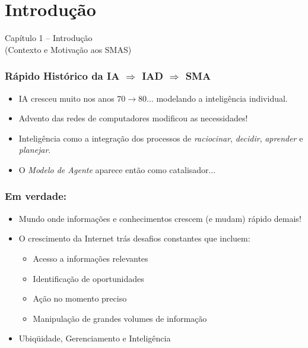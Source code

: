 
\section{Introdução}


\begin{frame}

\begin{center}
{\huge Capítulo 1 -- Introdução}\\
(Contexto e Motivação aos SMAS)
\end{center}

\end{frame}

\begin{frame}

  \frametitle{Rápido Histórico da IA $\Rightarrow$  IAD $\Rightarrow$ SMA}
    
\begin{itemize}
  \item IA cresceu muito nos anos $70 \rightarrow 80 ...$
   modelando a inteligência individual.
  \item  Advento das redes de computadores modificou as necessidades!
  \item  Inteligência como a integração dos processos de \textit{raciocinar},    \textit{decidir}, \textit{aprender} e  \textit{planejar}.
  \item  O \textit{Modelo de Agente} aparece então como catalisador...
\end{itemize}


\end{frame}

\begin{frame} %

 \frametitle{Em verdade:}

\begin{itemize}
  \item Mundo onde informações e conhecimentos crescem (e mudam) rápido demais!
    \item O crescimento da Internet trás desafios constantes que incluem:
    \begin{itemize}
  \item Acesso a informações relevantes
  \item Identificação de oportunidades
    \item Ação no momento preciso
  \item Manipulação de grandes volumes de informação
\end{itemize}
 \item Ubiqüidade, Gerenciamento e Inteligência
\end{itemize}

\end{frame}


